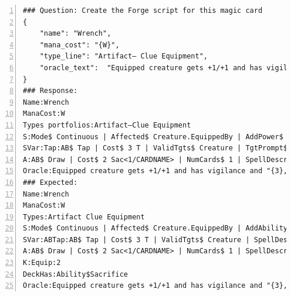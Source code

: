 \begin{algorithm}[ht]
	\caption{Esempio di output ottenuto da microsoft/phi-2 }
	\label{lst:inference_output}
        \footnotesize
	\begin{Verbatim}[numbers=left,breaklines]
### Question: Create the Forge script for this magic card
{
    "name": "Wrench",
    "mana_cost": "{W}",
    "type_line": "Artifact— Clue Equipment", 
    "oracle_text":  "Equipped creature gets +1/+1 and has vigilance and \"{3}, {T}: Tap target creature.\"\n{2}, Sacrifice CARD_NAME: Draw a card.\nEquip {2}"
} 
### Response: 
Name:Wrench
ManaCost:W
Types portfolios:Artifact—Clue Equipment
S:Mode$ Continuous | Affected$ Creature.EquippedBy | AddPower$ 1 | AddToughness$ 1 | AddKeyword$ Vigilance | AddAbility$ Tap | Description$ Equipped creature gets +1/+1 and has vigilance and "{3}, {T}: Tap target creature."
SVar:Tap:AB$ Tap | Cost$ 3 T | ValidTgts$ Creature | TgtPrompt$ Select target creature | SpellDescription$ Tap target creature.
A:AB$ Draw | Cost$ 2 Sac<1/CARDNAME> | NumCards$ 1 | SpellDescription$ Draw a card.\nK:Equip:2
Oracle:Equipped creature gets +1/+1 and has vigilance and "{3}, {T}: Tap target creature."\n{2}, Sacrifice Wrench: Draw a card\nEquip {2}
### Expected:
Name:Wrench
ManaCost:W
Types:Artifact Clue Equipment
S:Mode$ Continuous | Affected$ Creature.EquippedBy | AddAbility$ ABTap | AddPower$ 1 | AddToughness$ 1 | AddKeyword$ Vigilance | Description$ Equipped creature gets +1/+1 and has vigilance and "{3}, {T}: Tap target creature."
SVar:ABTap:AB$ Tap | Cost$ 3 T | ValidTgts$ Creature | SpellDescription$ Tap target creature.
A:AB$ Draw | Cost$ 2 Sac<1/CARDNAME> | NumCards$ 1 | SpellDescription$ Draw a card.
K:Equip:2
DeckHas:Ability$Sacrifice
Oracle:Equipped creature gets +1/+1 and has vigilance and "{3}, {T}: Tap target creature."\n{2}, Sacrifice Wrench: Draw a card.\nEquip {2}
	\end{Verbatim}
\end{algorithm}

